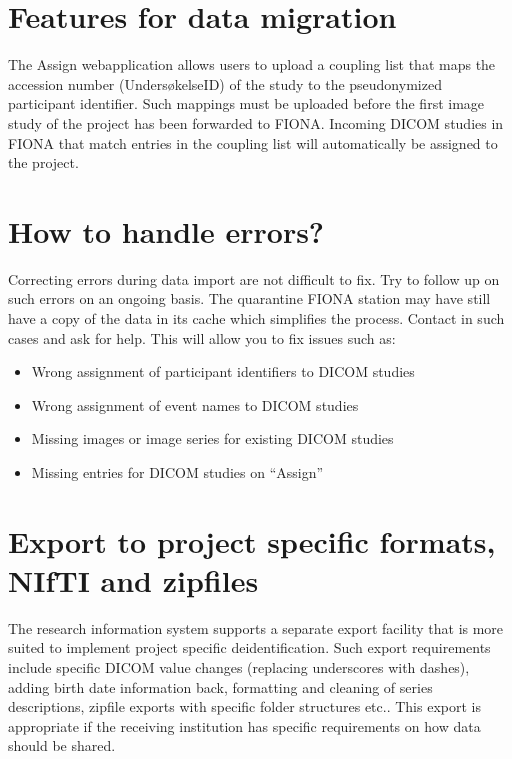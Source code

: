 \documentclass[letterpaper,10pt,english]{sphinxmanual}
\begin{document}
\section{Features for data migration}
\label{\detokenize{ServerAdmin/index:features-for-data-migration}}
\sphinxAtStartPar
The Assign web\sphinxhyphen{}application allows users to upload a coupling list that maps the accession number (Undersøkelse\sphinxhyphen{}ID) of the study to the pseudonymized participant identifier. Such mappings must be uploaded before the first image study of the project has been forwarded to FIONA. Incoming DICOM studies in FIONA that match entries in the coupling list will automatically be assigned to the project.


\section{How to handle errors?}
\label{\detokenize{ServerAdmin/index:how-to-handle-errors}}
\sphinxAtStartPar
Correcting errors during data import are not difficult to fix. Try to follow up on such errors on an ongoing basis. The quarantine FIONA station may have still have a copy of the data in its cache which simplifies the process. Contact  in such cases and ask for help. This will allow you to fix issues such as:
\begin{itemize}
\item {} 
\sphinxAtStartPar
Wrong assignment of participant identifiers to DICOM studies

\item {} 
\sphinxAtStartPar
Wrong assignment of event names to DICOM studies

\item {} 
\sphinxAtStartPar
Missing images or image series for existing DICOM studies

\item {} 
\sphinxAtStartPar
Missing entries for DICOM studies on “Assign”

\end{itemize}


\section{Export to project specific formats, NIfTI and zip\sphinxhyphen{}files}
\label{\detokenize{ServerAdmin/index:export-to-project-specific-formats-nifti-and-zip-files}}
\sphinxAtStartPar
The research information system supports a separate export facility that is more suited to implement project specific de\sphinxhyphen{}identification. Such export requirements include specific DICOM value changes (replacing underscores with dashes), adding birth date information back, formatting and cleaning of series descriptions, zip\sphinxhyphen{}file exports with specific folder structures etc.. This export is appropriate if the receiving institution has specific requirements on how data should be shared.
\end{document}
